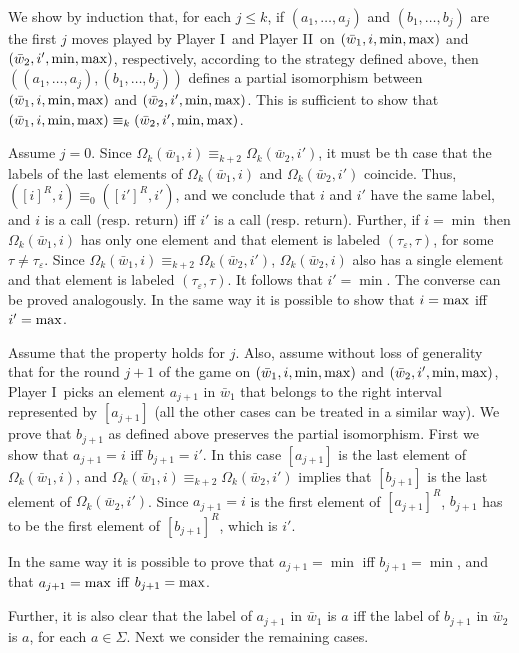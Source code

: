 \documentclass{LMCS}
\newcommand{\dupl}{Player II}
\newcommand{\spoiler}{Player I}
\newcommand{\w}{{\bar{w}}}
\newcommand{\e}{\varepsilon}
\theoremstyle{plain}
\theoremstyle{definition}
\begin{document}
We show by induction that, for each $j \leq k$, if $(a_1,\dots,a_j)$
and $(b_1,\dots,b_j)$ are the first $j$ moves played by \spoiler\ and
\dupl\ on $(\w_1,i,\min,\maxx)$ and $(\w_2,i',\min,\maxx)$,
respectively, according to the strategy defined above, then
$((a_1,\dots,a_j),(b_1,\dots,b_j))$ defines a partial isomorphism
between $(\w_1,i,\min,\maxx)$ and $(\w_2,i',\min,\maxx)$. This is
sufficient to show
 that $(\w_1,i,\min,\maxx) \equiv_k (\w_2,i',\min,\maxx)$.
  
Assume $j = 0$. Since $\Omega_k(\w_1,i) \equiv_{k+2}
\Omega_k(\w_2,i')$, it must be th case that the labels of the last
elements of $\Omega_k(\w_1,i)$ and $\Omega_k(\w_2,i')$ coincide.
Thus, $([i]^R,i) \equiv_0 ([i']^R,i')$, and we conclude that $i$ and
$i'$ have the same label, and $i$ is a call (resp. return) iff $i'$ is
a call (resp. return). Further, if $i = \min$ then $\Omega_k(\w_1,i)$
has only one element and that element is 
   labeled $(\tau_\e,\tau)$, for some $\tau \neq \tau_\e$. Since
   $\Omega_k(\w_1,i) \equiv_{k+2} \Omega_k(\w_2,i')$,
   $\Omega_k(\w_2,i)$ also has a single element and that element is
   labeled
   $(\tau_\e,\tau)$. It follows that $i' = \min$. The converse can be
   proved analogously. In the same way it is possible to show that $i
   = {\rm max}$ iff $i' = {\rm max}$.


Assume that the property holds for $j$. Also, assume without loss of
generality that for the round $j+1$ of the game on
$(\w_1,i,\min,\maxx)$ and $(\w_2,i',\min,\maxx)$, \spoiler\ picks an
element $a_{j+1}$ in $\w_1$ that belongs to the right interval
represented by $[a_{j+1}]$ (all the other cases can be treated in a
similar way). We prove that $b_{j+1}$ as defined above preserves the
partial isomorphism.  First we show that $a_{j+1} = i$ iff $b_{j+1} =
i'$. In this case $[a_{j+1}]$ is the last element of
$\Omega_k(\w_1,i)$, and $\Omega_k(\w_1,i) \equiv_{k+2}
\Omega_k(\w_2,i')$ implies that $[b_{j+1}]$ is the last element of
$\Omega_k(\w_2,i')$. Since $a_{j+1} = i$ is the first element of
$[a_{j+1}]^R$, $b_{j+1}$ has to be the first element of $[b_{j+1}]^R$,
which is $i'$.  

In the same way it is possible to prove that $a_{j+1} = \min$ iff
$b_{j+1} = \min$, and that $a_{j+1} = {\rm max}$ iff $b_{j+1} = {\rm max}$.


Further, it is also clear that the label of $a_{j+1}$ in $\w_1$ is $a$
iff the label of $b_{j+1}$ in $\w_2$ is $a$, for each $a \in
\Sigma$. Next we consider the remaining cases.
\end{document}
